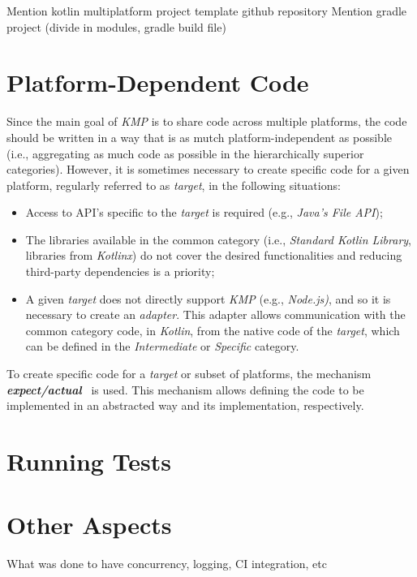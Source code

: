 Mention kotlin multiplatform project template github repository
Mention gradle project (divide in modules, gradle build file)


\section{Platform-Dependent Code}\label{sec:platform-dependent-code}

Since the main goal of \textit{KMP} is to share code across multiple platforms, the code should be written in a way that is as mutch platform-independent as possible (i.e., aggregating as much code as possible in the hierarchically superior categories).
However, it is sometimes necessary to create specific code for a given platform, regularly referred to as \textit{target}, in the following situations:

\begin{itemize}
    \item Access to API's specific to the \textit{target} is required (e.g., \textit{Java's File API});
    \item The libraries available in the common category (i.e., \textit{Standard Kotlin Library}, libraries from \textit{Kotlinx}) do not cover the desired functionalities and reducing third-party dependencies is a priority;
    \item A given \textit{target} does not directly support \textit{KMP} (e.g., \textit{Node.js)}, and so it is necessary to create an \textit{adapter}.
    This adapter allows communication with the common category code, in \textit{Kotlin}, from the native code of the \textit{target}, which can be defined in the \textit{Intermediate} or \textit{Specific} category.
\end{itemize}

To create specific code for a \textit{target} or subset of platforms, the mechanism \textbf{\textit{expect/actual}}~\cite{kmp-expect-actual} is used.
This mechanism allows defining the code to be implemented in an abstracted way and its implementation, respectively.


\section{Running Tests}\label{sec:running-tests}


\section{Other Aspects}\label{sec:other-aspects}
What was done to have concurrency, logging, CI integration, etc

